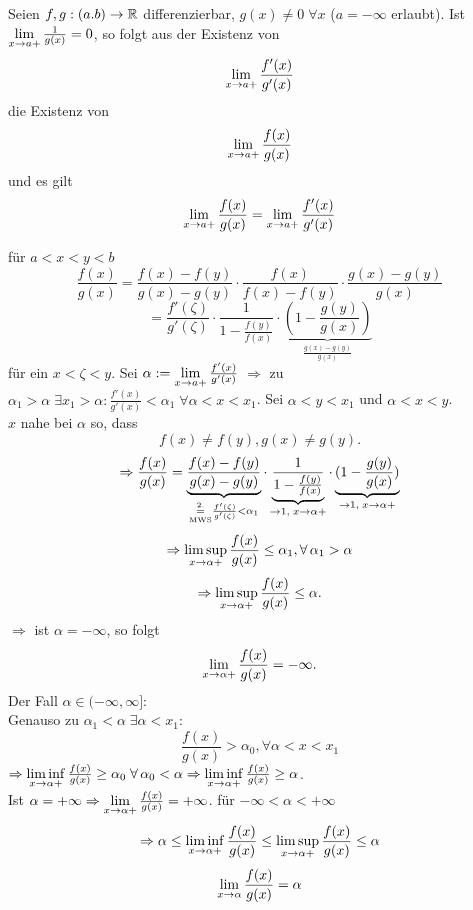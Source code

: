 \documentclass[../ana2.tex]{subfiles}
\begin{document}
\begin{satz}
    Seien \( f,g : (a.b) \rightarrow \mathbb{R} \) differenzierbar,
    \( g(x) \neq 0 \;\forall x  \) (\(a = -\infty\) erlaubt).
    Ist \( \lim\limits_{x\rightarrow{}a+} \frac{1}{g(x)} = 0 \), so folgt aus der 
    Existenz von 
    \[ \lim\limits_{x\rightarrow{}a+} \frac{f'(x)}{g'(x)} \] 
    die Existenz von
    \[ \lim\limits_{x\rightarrow{}a+} \frac{f(x)}{g(x)} \]
    und es gilt
    \[ \lim\limits_{x\rightarrow{}a+} \frac{f(x)}{g(x)} 
    = \lim\limits_{x\rightarrow{}a+} \frac{f'(x)}{g'(x)} \]
\end{satz}
\begin{bew}
    für \( a < x < y < b \)
    \[ \frac{f(x)}{g(x)} = \frac{f(x) - f(y)}{g(x) -g(y)} 
    \cdot \frac{f(x)}{f(x)-f(y)} \cdot \frac{g(x)-g(y)}{g(x)} \]
    \[ = \frac{f'(\zeta)}{g'(\zeta)} \cdot 
    \frac{1}{1-\frac{f(y)}{f(x)}} \cdot 
    \underbrace{\left(1 - \frac{g(y)}{g(x)} \right)}_
    {\frac{g(x)-g(y)}{g(x)}} \]
    für ein \( x < \zeta < y \).
    Sei \( \alpha := \lim\limits_{x\rightarrow{}a+} \frac{f'(x)}{g'(x)} \)
    \( \Rightarrow \) zu \( \alpha_1 > \alpha \; \exists 
    x_1 > \alpha : \frac{f'(x)}{g'(x)} < \alpha_1 
    \;\forall \alpha < x < x_1 \).
    Sei \( \alpha < y < x_1 \) und \(\alpha < x < y \). \\
    \(x\) nahe bei \(\alpha\) so, dass
    \[ f(x) \neq f(y), g(x) \neq g(y). \]
    \[ \Rightarrow \frac{f(x)}{g(x)} 
    = \underbrace{\frac{f(x)-f(y)}{g(x)-g(y)}}_{
        \overset{\text{2.}}{\underset{\text{MWS}}{=}} \frac{f'(\zeta)}{g'(\zeta)} < \alpha_1
    }
    \cdot \underbrace{\frac{1}{1-\frac{f(y)}{f(x)}} }_{
        \rightarrow 1, \;x\rightarrow \alpha+}
    \cdot \underbrace{(1- \frac{g(y)}{g(x)})}_{
        \rightarrow 1, \;x\rightarrow \alpha+} \]
    \[ \Rightarrow \limessupx{x}{\alpha+} \frac{f(x)}{g(x)} 
    \leq \alpha_1, \forall \alpha_1 > \alpha \]
    \[ \Rightarrow \limsup\limits_{x\rightarrow{}\alpha+} \frac{f(x)}{g(x)} \leq \alpha. \]
    \( \Rightarrow \) ist \( \alpha = -\infty \), so folgt 
    \[ \lim\limits_{x\rightarrow{}\alpha+} \frac{f(x)}{g(x)} = -\infty. \]
    Der Fall \( \alpha \in (-\infty, \infty]: \) \\
    Genauso zu \( \alpha_1 < \alpha \; \exists \alpha < x_1: \)
    \[ \frac{f(x)}{g(x)} > \alpha_0, \forall \alpha < x < x_1 \]
    \( \Rightarrow \limesinfx{x}{\alpha+} \frac{f(x)}{g(x)} 
    \geq \alpha_0\;\forall \alpha_0 < \alpha \\
    \Rightarrow \limesinfx{x}{\alpha+} \frac{f(x)}{g(x)} \geq \alpha \).\\
    Ist \( \alpha = +\infty \Rightarrow \lim\limits_{x\rightarrow{}\alpha+} 
    \frac{f(x)}{g(x)} = +\infty \).    
    für \( -\infty < \alpha < +\infty \)
    \[ \Rightarrow \alpha \leq \liminf\limits_{x\rightarrow{}\alpha+} \frac{f(x)}{g(x)} 
    \leq \limsup\limits_{x\rightarrow{}\alpha+} \frac{f(x)}{g(x)} \leq \alpha \]
    \[ \lim\limits_{x\rightarrow{}\alpha} \frac{f(x)}{g(x)} = \alpha \]
\end{bew}
\end{document}
